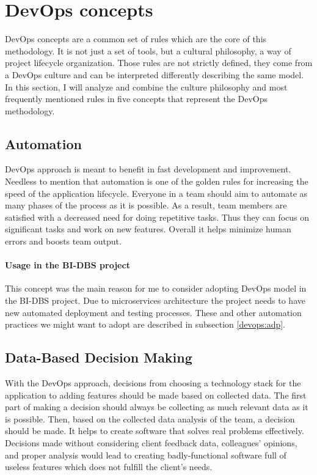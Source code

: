 \section{DevOps concepts} DevOps concepts are a common set of rules which are the core of this methodology. It is not just a set of tools, but a cultural philosophy, a way of project lifecycle organization. Those rules are not strictly defined, they come from a DevOps culture and can be interpreted differently describing the same model. In this section, I will analyze and combine the culture philosophy and most frequently mentioned rules \cite{devops-conc1, devops-conc2} in five concepts that represent the DevOps methodology.

\subsection{Automation} DevOps approach is meant to benefit in fast development and improvement. Needless to mention that automation is one of the golden rules for increasing the speed of the application lifecycle. Everyone in a team should aim to automate as many phases of the process as it is possible. As a result, team members are satisfied with a decreased need for doing repetitive tasks. Thus they can focus on significant tasks and work on new features. Overall it helps minimize human errors and boosts team output.

\paragraph*{Usage in the BI-DBS project} This concept was the main reason for me to consider adopting DevOps model in the BI-DBS project. Due to microservices architecture the project needs to have new automated deployment and testing processes. These and other automation practices we might want to adopt are described in subsection \ref{devops:adp}.


\subsection{Data-Based Decision Making} With the DevOps approach, decisions from choosing a technology stack for the application to adding features should be made based on collected data. The first part of making a decision should always be collecting as much relevant data as it is possible. Then, based on the collected data analysis of the team, a decision should be made. It helps to create software that solves real problems effectively. Decisions made without considering client feedback data, colleagues' opinions, and proper analysis would lead to creating badly-functional software full of useless features which does not fulfill the client's needs.

